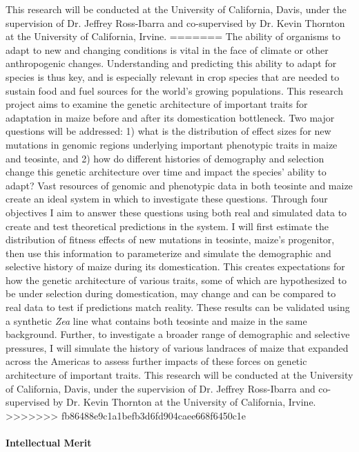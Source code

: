 This research will be conducted at the University of California, Davis, under the supervision of Dr. Jeffrey Ross\--Ibarra and co-supervised by Dr. Kevin Thornton at the University of California, Irvine.
=======
The ability of organisms to adapt to new and changing conditions is vital in the face of climate or other anthropogenic changes. Understanding and predicting this ability to adapt for species is thus key, and is especially relevant in crop species that are needed to sustain food and fuel sources for the world's growing populations. This research project aims to examine the genetic architecture of important traits for adaptation in maize before and after its domestication bottleneck. Two major questions will be addressed: 1) what is the distribution of effect sizes for new mutations in genomic regions underlying important phenotypic traits in maize and teosinte, and 2) how do different histories of demography and selection change this genetic architecture over time and impact the species' ability to adapt? Vast resources of genomic and phenotypic data in both teosinte and maize create an ideal system in which to investigate these questions. Through four objectives I aim to answer these questions using both real and simulated data to create and test theoretical predictions in the system. I will first estimate the distribution of fitness effects of new mutations in teosinte, maize's progenitor, then use this information to parameterize and simulate the demographic and selective history of maize during its domestication. This creates expectations for how the genetic architecture of various traits, some of which are hypothesized to be under selection during domestication, may change and can be compared to real data to test if predictions match reality. These results can be validated using a synthetic \emph{Zea} line what contains both teosinte and maize in the same background. Further, to investigate a broader range of demographic and selective pressures, I will simulate the history of various landraces of maize that expanded across the Americas to assess further impacts of these forces on genetic architecture of important traits. This research will be conducted at the University of California, Davis, under the supervision of Dr. Jeffrey Ross\--Ibarra and co-supervised by Dr. Kevin Thornton at the University of California, Irvine.
>>>>>>> fb86488e9c1a1befb3d6fd904caee668f6450c1e

\vspace{-0.4cm}

\paragraph{Intellectual Merit}  

